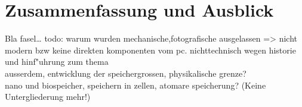 
\chapter{Zusammenfassung und Ausblick}
\label{ch:Zusammenfassung}
Bla fasel\ldots
todo: warum wurden mechanische,fotografische ausgelassen => nicht modern bzw keine direkten komponenten vom pc. nichttechnisch wegen historie und hinf"uhrung zum thema
\\
ausserdem, entwicklung der speichergrossen, physikalische grenze?
\\
nano und biospeicher, speichern in zellen, atomare speicherung?
(Keine Untergliederung mehr!)

